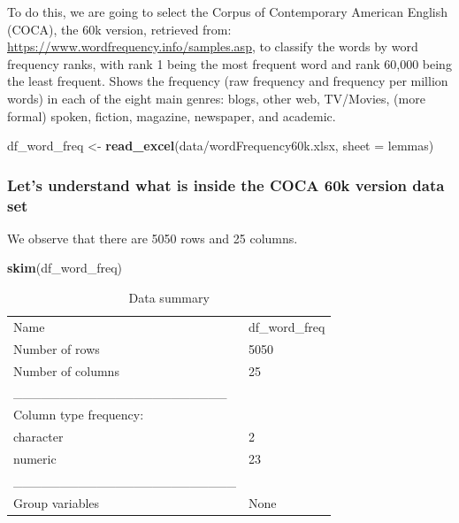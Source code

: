\documentclass[
]{article}
\newenvironment{Shaded}{\begin{snugshade}}{\end{snugshade}}
\newcommand{\AttributeTok}[1]{\textcolor[rgb]{0.13,0.29,0.53}{#1}}
\newcommand{\FunctionTok}[1]{\textcolor[rgb]{0.13,0.29,0.53}{\textbf{#1}}}
\newcommand{\NormalTok}[1]{#1}
\newcommand{\OtherTok}[1]{\textcolor[rgb]{0.56,0.35,0.01}{#1}}
\newcommand{\StringTok}[1]{\textcolor[rgb]{0.31,0.60,0.02}{#1}}
\begin{document}
To do this, we are going to select the Corpus of Contemporary American
English (COCA), the 60k version, retrieved from:
\url{https://www.wordfrequency.info/samples.asp}, to classify the words
by word frequency ranks, with rank 1 being the most frequent word and
rank 60,000 being the least frequent. Shows the frequency (raw frequency
and frequency per million words) in each of the eight main genres:
blogs, other web, TV/Movies, (more formal) spoken, fiction, magazine,
newspaper, and academic.

\begin{Shaded}
\begin{Highlighting}[]
\NormalTok{df\_word\_freq }\OtherTok{\textless{}{-}} \FunctionTok{read\_excel}\NormalTok{(}\StringTok{\textquotesingle{}data/wordFrequency60k.xlsx\textquotesingle{}}\NormalTok{, }
                           \AttributeTok{sheet =} \StringTok{\textquotesingle{}lemmas\textquotesingle{}}\NormalTok{) }
\end{Highlighting}
\end{Shaded}

\hypertarget{lets-understand-what-is-inside-the-coca-60k-version-data-set}{%
\subsubsection{Let's understand what is inside the COCA 60k version data
set}\label{lets-understand-what-is-inside-the-coca-60k-version-data-set}}

We observe that there are 5050 rows and 25 columns.

\begin{Shaded}
\begin{Highlighting}[]
\FunctionTok{skim}\NormalTok{(df\_word\_freq)}
\end{Highlighting}
\end{Shaded}

\begin{longtable}[]{@{}ll@{}}
\caption{Data summary}\tabularnewline
\toprule\noalign{}
\endfirsthead
\endhead
\bottomrule\noalign{}
\endlastfoot
Name & df\_word\_freq \\
Number of rows & 5050 \\
Number of columns & 25 \\
\_\_\_\_\_\_\_\_\_\_\_\_\_\_\_\_\_\_\_\_\_\_\_ & \\
Column type frequency: & \\
character & 2 \\
numeric & 23 \\
\_\_\_\_\_\_\_\_\_\_\_\_\_\_\_\_\_\_\_\_\_\_\_\_ & \\
Group variables & None \\
\end{longtable}
\end{document}
